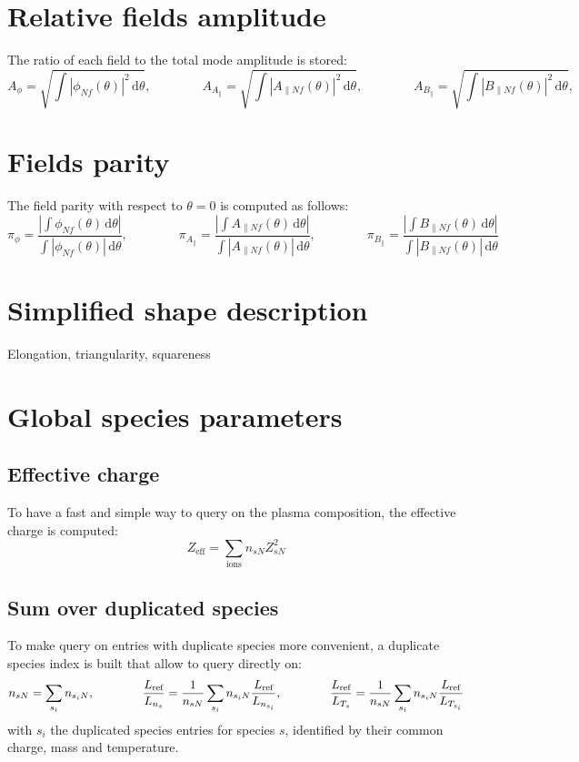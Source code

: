 \documentclass[fleqn]{report}
\begin{document}
\section{Relative fields amplitude}
The ratio of each field to the total mode amplitude is stored:
\begin{equation*}
A_\phi = \sqrt{\int |\phi_{Nf}(\theta)|^2\,\textrm{d}\theta}, \qquad \qquad
A_{A_\parallel} = \sqrt{\int |A_{\parallel Nf}(\theta)|^2\,\textrm{d}\theta}, \qquad \qquad
A_{B_\parallel} = \sqrt{\int |B_{\parallel Nf}(\theta)|^2\,\textrm{d}\theta}, 
\end{equation*}

\section{Fields parity}
The field parity with respect to $\theta=0$ is computed as follows:
\begin{equation*}
\pi_\phi = \frac{\left| \int \phi_{Nf}(\theta) \,\textrm{d}\theta \right|}{\int |\phi_{Nf}(\theta)| \,\textrm{d}\theta}, \qquad \qquad 
\pi_{A_\parallel} = \frac{\left| \int A_{\parallel Nf}(\theta) \,\textrm{d}\theta \right|}{\int |A_{\parallel Nf}(\theta)| \,\textrm{d}\theta}, \qquad \qquad 
\pi_{B_\parallel} = \frac{\left| \int B_{\parallel Nf}(\theta) \,\textrm{d}\theta \right|}{\int |B_{\parallel Nf}(\theta)| \,\textrm{d}\theta}
\end{equation*}

\section{Simplified shape description}
Elongation, triangularity, squareness

\section{Global species parameters}
\subsection{Effective charge}
To have a fast and simple way to query on the plasma composition, the effective charge is computed:
$$Z_\textrm{eff} = \sum_\textrm{ions} n_{sN}Z_{sN}^2$$ 

\subsection{Sum over duplicated species}
To make query on entries with duplicate species more convenient, a duplicate species index is built that allow to query directly on:
$$n_{sN}=\sum_{s_i}n_{s_iN}, \qquad \qquad \frac{L_{\textrm{ref}}}{L_{n_s}}=\frac{1}{n_{sN}}\sum_{s_i}n_{s_iN}\frac{L_{\textrm{ref}}}{L_{n_{s_i}}}, \qquad \qquad \frac{L_{\textrm{ref}}}{L_{T_s}}=\frac{1}{n_{sN}}\sum_{s_i}n_{s_iN}\frac{L_{\textrm{ref}}}{L_{T_{s_i}}}$$
with $s_i$ the duplicated species entries for species $s$, identified by their common charge, mass and temperature.
\end{document}
